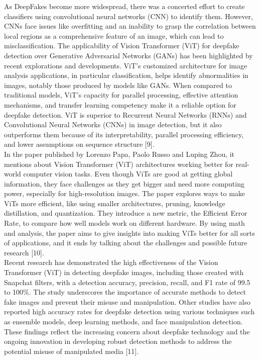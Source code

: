 \noindent As DeepFakes become more widespread, there was a concerted effort to create classifiers using convolutional neural networks (CNN) to identify them. However, CNNs face issues like overfitting and an inability to grasp the correlation between local regions as a comprehensive feature of an image, which can lead to misclassification. The applicability of Vision Transformer (ViT) for deepfake detection over Generative Adversarial Networks (GANs) has been highlighted by recent explorations and developments. ViT's customized architecture for image analysis applications, in particular classification, helps identify abnormalities in images, notably those produced by models like GANs. When compared to traditional models, ViT's capacity for parallel processing, effective attention mechanisms, and transfer learning competency make it a reliable option for deepfake detection. ViT is superior to Recurrent Neural Networks (RNNs) and Convolutional Neural Networks (CNNs) in image detection, but it also outperforms them because of its interpretability, parallel processing efficiency, and lower assumptions on sequence structure [9].\\

\noindent In the paper published by Lorenzo Papa, Paolo Russo and Luping Zhou, it mentions about Vision Transformer (ViT) architectures working better for real-world computer vision tasks. Even though ViTs are good at getting global information, they face challenges as they get bigger and need more computing power, especially for high-resolution images. The paper explores ways to make ViTs more efficient, like using smaller architectures, pruning, knowledge distillation, and quantization. They introduce a new metric, the Efficient Error Rate, to compare how well models work on different hardware. By using math and analysis, the paper aims to give insights into making ViTs better for all sorts of applications, and it ends by talking about the challenges and possible future research [10].\\

\noindent Recent research has demonstrated the high effectiveness of the Vision Transformer (ViT) in detecting deepfake images, including those created with Snapchat filters, with a detection accuracy, precision, recall, and F1 rate of 99.5 to 100\%. The study underscores the importance of accurate methods to detect fake images and prevent their misuse and manipulation. Other studies have also reported high accuracy rates for deepfake detection using various techniques such as ensemble models, deep learning methods, and face manipulation detection. These findings reflect the increasing concern about deepfake technology and the ongoing innovation in developing robust detection methods to address the potential misuse of manipulated media [11].\\

